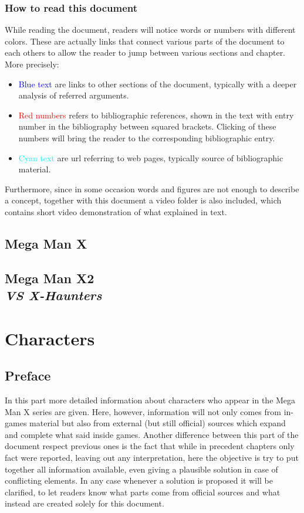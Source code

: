 \documentclass[openany]{report}
\begin{document}
	\section*{How to read this document}
	While reading the document, readers will notice words or numbers with different colors. These are actually links that connect various parts of the document to each others to allow the reader to jump between various sections and chapter. More precisely:
	\begin{itemize}
		\item \textcolor{blue}{Blue text} are links to other sections of the document, typically with a deeper analysis of referred arguments.
		\item \textcolor{red}{Red numbers} refers to bibliographic references, shown in the text with entry number in the bibliography between squared brackets. Clicking of these numbers will bring the reader to the corresponding bibliographic entry.
		\item \textcolor{cyan}{Cyan text} are url referring to web pages, typically source of bibliographic material.
	\end{itemize}
	
	Furthermore, since in some occasion words and figures are not enough to describe a concept, together with this document a video folder is also included, which contains short video demonstration of what explained in text.
	
\chapter{Mega Man X}
	

\chapter[Mega Man X2]{Mega Man X2\\[2ex]\Large\itshape{VS X-Haunters}}
	

\part{Characters}
	\chapter*{Preface}
	In this part more detailed information about characters who appear in the Mega Man X series are given. Here, however, information will not only comes from in-games material but also from external (but still official) sources which expand and complete what said inside games. Another difference between this part of the document respect previous ones is the fact that while in precedent chapters only fact were reported, leaving out any interpretation, here the objective is try to put together all information available, even giving a plausible solution in case of conflicting elements. In any case whenever a solution is proposed it will be clarified, to let readers know what parts come from official sources and what instead are created solely for this document.
\end{document}
